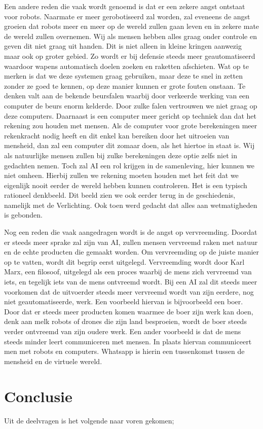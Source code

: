 \documentclass{article}
\begin{document}
Een andere reden die vaak wordt genoemd is dat er een zekere angst ontstaat voor robots. Naarmate er meer gerobotiseerd zal worden, zal eveneens de angst groeien dat robots meer en meer op de wereld zullen gaan leven en in zekere mate de wereld zullen overnemen. Wij als mensen hebben alles graag onder controle en geven dit niet graag uit handen. Dit is niet alleen in kleine kringen aanwezig maar ook op groter gebied. Zo wordt er bij defensie steeds meer geautomatiseerd waardoor wapens automatisch doelen zoeken en raketten afschieten. Wat op te merken is dat we deze systemen graag gebruiken, maar deze te snel in zetten zonder ze goed te kennen, op deze manier kunnen er grote fouten onstaan. Te denken valt aan de bekende beursfalen\cite{vriendofvijand} waarbij door verkeerde werking van een computer de beurs enorm kelderde. Door zulke falen vertrouwen we niet graag op deze computers. Daarnaast is een computer meer gericht op techniek dan dat het rekening zou houden met mensen. Als de computer voor grote berekeningen meer rekenkracht nodig heeft en dit enkel kan bereiken door het uitroeien van mensheid, dan zal een computer dit zomaar doen, als het hiertoe in staat is. Wij als natuurlijke mensen zullen bij zulke berekeningen deze optie zelfs niet in gedachten nemen. Toch zal AI een rol krijgen in de samenleving, hier kunnen we niet omheen. Hierbij zullen we rekening moeten houden met het feit dat we eigenlijk nooit eerder de wereld hebben kunnen controleren. Het is een typisch rationeel denkbeeld. Dit beeld zien we ook eerder terug in de geschiedenis, namelijk met de Verlichting. Ook toen werd gedacht dat alles aan wetmatigheden is gebonden.

Nog een reden die vaak aangedragen wordt is de angst op vervreemding. Doordat er steeds meer sprake zal zijn van AI, zullen mensen vervreemd raken met natuur en de echte producten die gemaakt worden. Om vervreemding op de juiste manier op te vatten, wordt dit begrip eerst uitgelegd. Vervreemding wordt door Karl Marx\cite{vriendofvijand}, een filosoof, uitgelegd als een proces waarbij de mens zich vervreemd van iets, en tegelijk iets van de mens ontvreemd wordt. Bij een AI zal dit steeds meer voorkomen dat de uitvoerder steeds meer vervreemd wordt van zijn eerdere, nog niet geautomatiseerde, werk. Een voorbeeld hiervan is bijvoorbeeld een boer. Door dat er steeds meer producten komen waarmee de boer zijn werk kan doen, denk aan melk robots of drones die zijn land besproeien, wordt de boer steeds verder ontvreemd van zijn oudere werk. Een ander voorbeeld is dat de mens steeds minder leert communiceren met mensen. In plaats hiervan communiceert men met robots en computers. Whatsapp is hierin een tussenkomst tussen de mensheid en de virtuele wereld. 

\section{Conclusie}
Uit de deelvragen is het volgende naar voren gekomen; 

\newpage
\nocite{robotsamenleving,vriendofvijand,arbeidsmarkt,breinoverbodig,stephenhawking,killemachine,uitgeroeid,autonomous,benificialai,pastandfuture}


% 
% 
\end{document}
